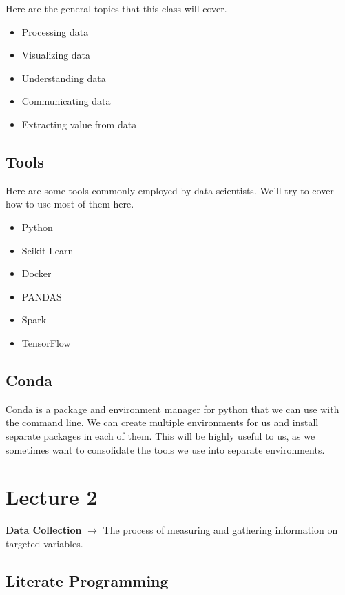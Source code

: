 \documentclass[english, 10pt]{article}
\begin{document}
Here are the general topics that this class will cover.

\begin{itemize}
	\item Processing data
	\item Visualizing data
	\item Understanding data
	\item Communicating data
	\item Extracting value from data
\end{itemize}

\subsection{Tools}

Here are some tools commonly employed by data scientists. We'll try to cover how to use most of them here.

\begin{itemize}
	\item Python
	\item Scikit-Learn
	\item Docker
	\item PANDAS
	\item Spark
	\item TensorFlow
\end{itemize}

\subsection{Conda}

Conda is a package and environment manager for python that we can use with the command line.
We can create multiple environments for us and install separate packages in each of them.
This will be highly useful to us, as we sometimes want to consolidate the tools we use into separate environments.

\section{Lecture 2}

\begin{tcolorbox}[title=Definition:,colframe=red!75!black,colback=red!5!white,arc=0pt,fonttitle=\bfseries]
\textbf{Data Collection} $\rightarrow$ The process of measuring and gathering information on targeted variables.
\end{tcolorbox}

\subsection{Literate Programming}
\end{document}
